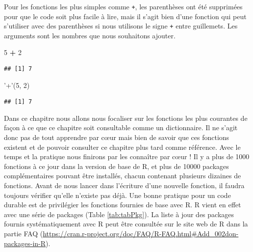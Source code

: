 \documentclass[
]{book}
\newenvironment{Shaded}{\begin{snugshade}}{\end{snugshade}}
\newcommand{\DecValTok}[1]{\textcolor[rgb]{0.00,0.00,0.81}{#1}}
\newcommand{\NormalTok}[1]{#1}
\newcommand{\OperatorTok}[1]{\textcolor[rgb]{0.81,0.36,0.00}{\textbf{#1}}}
\newcommand{\StringTok}[1]{\textcolor[rgb]{0.31,0.60,0.02}{#1}}
\begin{document}
Pour les fonctions les plus simples comme \texttt{+}, les parenthèses ont été supprimées pour que le code soit plus facile à lire, mais il s'agit bien d'une fonction qui peut s'utiliser avec des parenthèses si nous utilisons le signe \texttt{+} entre guillemets. Les arguments sont les nombres que nous souhaitons ajouter.

\begin{Shaded}
\begin{Highlighting}[]
\DecValTok{5} \OperatorTok{+}\StringTok{ }\DecValTok{2}
\end{Highlighting}
\end{Shaded}

\begin{verbatim}
## [1] 7
\end{verbatim}

\begin{Shaded}
\begin{Highlighting}[]
\StringTok{'+'}\NormalTok{(}\DecValTok{5}\NormalTok{, }\DecValTok{2}\NormalTok{)}
\end{Highlighting}
\end{Shaded}

\begin{verbatim}
## [1] 7
\end{verbatim}

Dans ce chapitre nous allons nous focaliser sur les fonctions les plus courantes de façon à ce que ce chapitre soit consultable comme un dictionnaire. Il ne s'agit donc pas de tout apprendre par cœur mais bien de savoir que ces fonctions existent et de pouvoir consulter ce chapitre plus tard comme référence. Avec le temps et la pratique nous finirons par les connaître par cœur ! Il y a plus de 1000 fonctions à ce jour dans la version de base de R, et plus de 10000 packages complémentaires pouvant être installés, chacun contenant plusieurs dizaines de fonctions. Avant de nous lancer dans l'écriture d'une nouvelle fonction, il faudra toujours vérifier qu'elle n'existe pas déjà. Une bonne pratique pour un code durable est de privilégier les fonctions fournies de base avec R. R vient en effet avec une série de packages (Table \ref{tab:tabPkg}). La liste à jour des packages fournis systématiquement avec R peut être consultée sur le site web de R dans la partie FAQ (\url{https://cran.r-project.org/doc/FAQ/R-FAQ.html\#Add_002don-packages-in-R}).
\end{document}

